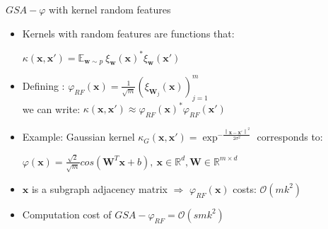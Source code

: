 \documentclass{beamer}
\begin{document}
\begin{frame}{$GSA-\varphi$ with kernel random features}
    \begin{itemize}
    \footnotesize
        \item Kernels with random features are functions that:\\
        \begin{center}
            $\kappa(\mathbf{x},\mathbf{x}')= \mathbb{E}_{\mathbf{w} \sim p}~ \xi_\mathbf{w}(\mathbf{x})^* \xi_\mathbf{w}(\mathbf{x}')$
        \end{center}

        \vfill
        \item Defining : $\varphi_{RF}(\mathbf{x}) = \frac{1}{\sqrt{m}} ( \xi_{\mathbf{W}_j}(\mathbf{x}) )_{j=1}^m$\\ we can write: $\kappa(\mathbf{x},\mathbf{x}')\approx \varphi_{RF}(\mathbf{x})^*\varphi_{RF}(\mathbf{x}')$
        \vfill
        \item Example: Gaussian kernel $\kappa_{G}(\mathbf{x},\mathbf{x}')=\exp^{-\frac{\left \| \mathbf{x}-\mathbf{x}'\right\|^2}{2\sigma^2}}$ corresponds to:\\
        \begin{center}
            $\varphi(\mathbf{x}) = \frac{\sqrt{2}}{\sqrt{m}} cos( \mathbf{W}^T\mathbf{x}+b ),~ \mathbf{x}\in\mathbb{R}^d,  \mathbf{W}\in \mathbb{R}^{m\times d}$
        \end{center}
        \vfill
        \item $\mathbf{x}$ is a subgraph adjacency matrix $\Rightarrow$ $\varphi_{RF}(\mathbf{x})$ costs: $\mathcal{O}(mk^2)$
        \vfill
        \item  Computation cost of $GSA-\varphi_{RF}=  \mathcal{O}( s m k^2)$
    
\end{itemize}
\end{frame}
\end{document}
